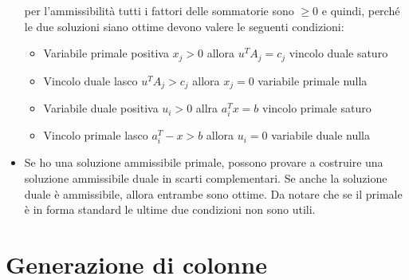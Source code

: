 \begin{itemize}
\begin{itemize}
	\end{itemize}
	per l'ammissibilità tutti i fattori delle sommatorie sono $\geq 0$ e quindi, perché le due soluzioni siano ottime devono valere le seguenti condizioni:
	\begin{itemize}
		\item Variabile primale positiva $x_j > 0$ allora $u^TA_j = c_j$ vincolo duale saturo
		\item Vincolo duale lasco $u^TA_j > c_j$ allora $x_j = 0$ variabile primale nulla
		\item Variabile duale positiva $u_i > 0$ allra $a_{i}^Tx = b $ vincolo primale saturo 
		\item Vincolo primale lasco $a_{i}^T-x > b$ allora $u_i = 0$ variabile duale nulla
	\end{itemize}
	\item Se ho una soluzione ammissibile primale, possono provare a costruire una soluzione ammissibile duale in scarti complementari. Se anche la soluzione duale è ammissibile, allora entrambe sono ottime. Da notare che se il primale è in forma standard le ultime due condizioni non sono utili.
\end{itemize}

\section{Generazione di colonne}

